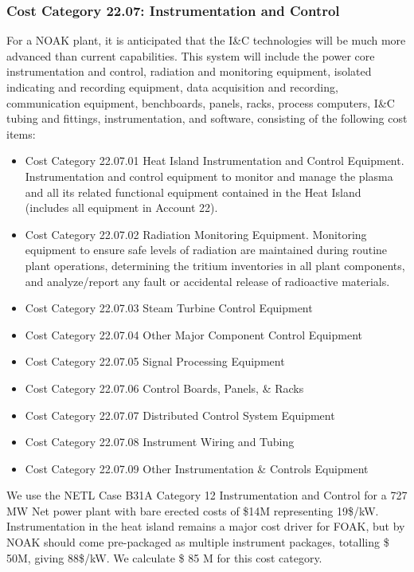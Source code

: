 \subsubsection{Cost Category 22.07: Instrumentation and Control }

For a NOAK plant, it is anticipated that the I\&C technologies will be much more advanced than current  capabilities. This system will include the power core instrumentation and control, radiation and  monitoring equipment, isolated indicating and recording equipment, data acquisition and  recording, communication equipment, benchboards, panels, racks, process computers, I\&C tubing and fittings, instrumentation, and software, consisting of the following cost items:

\begin{itemize}
\item Cost Category 22.07.01 Heat Island Instrumentation and Control Equipment. Instrumentation and control equipment to monitor and manage the plasma and all  its related functional equipment contained in the Heat Island (includes all equipment in Account 22).

\item Cost Category 22.07.02 Radiation Monitoring Equipment. Monitoring equipment to ensure safe levels of radiation are maintained  during routine plant operations, determining the tritium inventories in all plant components, and  analyze/report any fault or accidental release of radioactive materials. 

\item Cost Category 22.07.03 Steam Turbine Control Equipment	

\item Cost Category 22.07.04 Other Major Component Control Equipment	

\item Cost Category 22.07.05 Signal Processing Equipment	

\item Cost Category 22.07.06 Control Boards, Panels, \& Racks	
\item Cost Category 22.07.07 Distributed Control System Equipment	
\item Cost Category 22.07.08 Instrument Wiring and Tubing	
\item Cost Category 22.07.09 Other Instrumentation \& Controls Equipment	


\end{itemize}


We use the NETL Case B31A Category 12 Instrumentation and Control for a 727 MW Net power plant with bare erected costs of \$14M representing 19\$/kW.  Instrumentation in the heat island remains a major cost driver for FOAK, but by NOAK should come pre-packaged as multiple instrument packages, totalling \$ 50M, giving 88\$/kW.   We calculate \$ 85 M for this cost category.